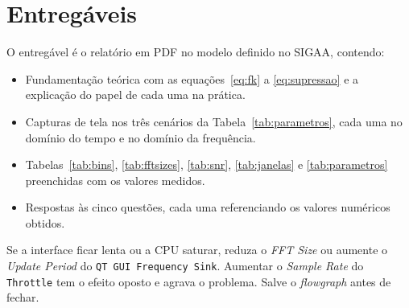 \documentclass[11pt,a4paper]{article}
\begin{document}
\section{Entregáveis}

O entregável é o relatório em PDF no modelo definido no SIGAA, contendo:

\begin{itemize}
  \item Fundamentação teórica com as equações~\eqref{eq:fk} a
    \eqref{eq:supressao} e a explicação do papel de cada uma na prática.
  \item Capturas de tela nos três cenários da Tabela~\ref{tab:parametros},
    cada uma no domínio do tempo e no domínio da frequência.
  \item Tabelas~\ref{tab:bins}, \ref{tab:fftsizes}, \ref{tab:snr},
    \ref{tab:janelas} e \ref{tab:parametros} preenchidas com os valores
    medidos.
  \item Respostas às cinco questões, cada uma referenciando os valores
    numéricos obtidos.
\end{itemize}

\begin{atencao}[Execução]
Se a interface ficar lenta ou a CPU saturar, reduza o \textit{FFT Size} ou
aumente o \textit{Update Period} do \texttt{QT GUI Frequency Sink}. Aumentar
o \textit{Sample Rate} do \texttt{Throttle} tem o efeito oposto e agrava o
problema. Salve o \textit{flowgraph} antes de fechar.
\end{atencao}
\end{document}
